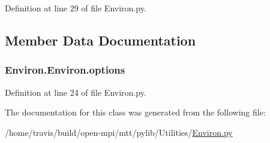 Definition at line 29 of file Environ.\-py.



\subsection{Member Data Documentation}
\hypertarget{class_environ_1_1_environ_a9e1a6482623e5f36b1de334c27df5011}{
\subsubsection[{options}]{\setlength{\rightskip}{0pt plus 5cm}Environ.\-Environ.\-options}}\label{class_environ_1_1_environ_a9e1a6482623e5f36b1de334c27df5011}


Definition at line 24 of file Environ.\-py.



The documentation for this class was generated from the following file\-:\begin{DoxyCompactItemize}
\item 
/home/travis/build/open-\/mpi/mtt/pylib/\-Utilities/\hyperlink{_environ_8py}{Environ.\-py}\end{DoxyCompactItemize}
